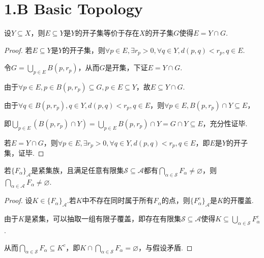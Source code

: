 \section{1.B Basic Topology}

\begin{theorem}\label{br2.30}
    设\(Y \subseteq X\)，则\(E \subseteq Y\)是\(Y\)的开子集等价于存在\(X\)的开子集\(G\)使得\(E=Y \cap G\).
\end{theorem}

\begin{proof}
    若\(E \subseteq Y\)是\(Y\)的开子集，则\(\forall p \in E, \exists r_p>0, \forall q \in Y, d(p,q)<r_p, q \in E\).

    令\(G=\bigcup_{p \in E} B(p,r_p)\)，从而\(G\)是开集，下证\(E=Y \cap G\).

    由于\(\forall p \in E, p \in B(p,r_p) \subseteq G, p \in E \subseteq Y\)，故\(E \subseteq Y \cap G\).

    由于\(\forall q \in B(p,r_p), q \in Y, d(p,q)<r_p, q \in E\)，则\(\forall p \in E, B(p,r_p) \cap Y \subseteq E\)，

    即\(\bigcup_{p \in E} (B(p,r_p) \cap Y)=\bigcup_{p \in E} B(p,r_p) \cap Y=G \cap Y \subseteq E\)，充分性证毕.

    若\(E=Y \cap G\)，则\(\forall p \in E, \exists r_p>0, \forall q \in Y, d(p,q)<r_p, q \in E\)，即\(E\)是\(Y\)的开子集，证毕.
\end{proof}

\begin{theorem}\label{br2.36}
    若\(\{F_\alpha\}_{\mathcal{A}}\)是紧集族，且满足任意有限集\(\mathcal{S} \subseteq \mathcal{A}\)都有\(\bigcap_{\alpha \in \mathcal{S}} F_\alpha \ne \varnothing\)，则\(\bigcap_{\alpha \in \mathcal{A}} F_\alpha \ne \varnothing\).
\end{theorem}

\begin{proof}
    设\(K \in \{F_\alpha\}_{\mathcal{A}}\).若\(K\)中不存在同时属于所有\(F_\alpha\)的点，则\(\{F_\alpha^c\}_{\mathcal{A}}\)是\(K\)的开覆盖.

    由于\(K\)是紧集，可以抽取一组有限子覆盖，即存在有限集\(\mathcal{S} \subseteq \mathcal{A}\)使得\(K \subseteq \bigcup_{\alpha \in \mathcal{S}} F_\alpha^c\).

    从而\(\bigcap_{\alpha \in \mathcal{S}} F_\alpha \subseteq K^c\)，即\(K \cap \bigcap_{\alpha \in \mathcal{S}} F_\alpha=\varnothing\)，与假设矛盾.
\end{proof}

